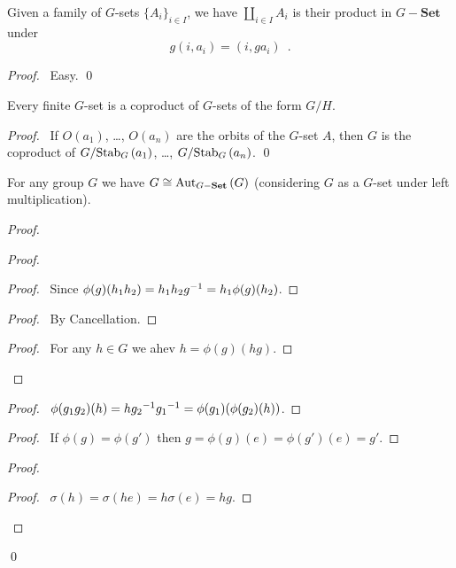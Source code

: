 \begin{prop}
Given a family of $G$-sets $\{ A_i \}_{i \in I}$, we have $\coprod_{i \in I} A_i$ is their product in $G-\mathbf{Set}$ under
\[ g (i,a_i) = (i, ga_i) \enspace . \]
\end{prop}

\begin{proof}
\pf\ Easy. \qed
\end{proof}

\begin{prop}
Every finite $G$-set is a coproduct of $G$-sets of the form $G/H$.
\end{prop}

\begin{proof}
\pf\ If $O(a_1)$, \ldots, $O(a_n)$ are the orbits of the $G$-set $A$, then $G$ is the coproduct of $G / \mathrm{Stab}_{G} \left( {a_1} \right)$, \ldots, $G / \mathrm{Stab}_{G} \left( {a_n} \right)$. \qed
\end{proof}

\begin{prop}
For any group $G$ we have $G \cong \mathrm{Aut}_{G-\mathbf{Set}} \left( {G} \right)$ (considering $G$ as a $G$-set under left multiplication).
\end{prop}

\begin{proof}
\pf
{}
\begin{proof}
	\begin{proof}
		\pf\ Since $\phi(g)(h_1h_2) = h_1h_2{g}^{-1} = h_1 \phi(g)(h_2)$.
	\end{proof}
	\begin{proof}
		\pf\ By Cancellation.
	\end{proof}
	\begin{proof}
		\pf\ For any $h \in G$ we ahev $h = \phi(g)(hg)$.
	\end{proof}
\end{proof}
\begin{proof}
	\pf\ $\phi(g_1 g_2)(h) = h{g_2}^{-1} {g_1}^{-1} = \phi(g_1)(\phi(g_2)(h))$.
\end{proof}
\begin{proof}
	\pf\ If $\phi(g) = \phi(g')$ then $g = \phi(g)(e) = \phi(g')(e) = g'$.
\end{proof}
	\begin{proof}
		\begin{proof}
		\pf\ $\sigma(h) = \sigma(he) = h \sigma(e) = hg$.
		\end{proof}
	\end{proof}
\qed
\end{proof}

